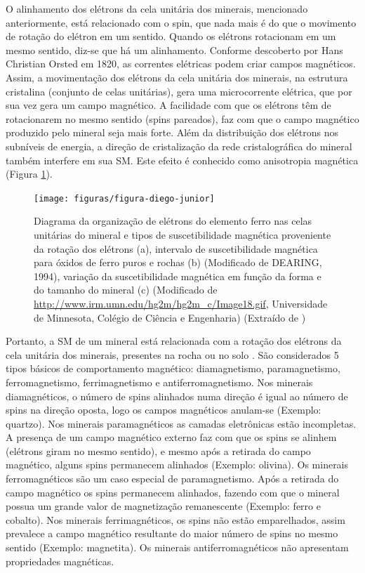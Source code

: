 O alinhamento dos elétrons da cela unitária dos minerais, mencionado anteriormente, está relacionado com o spin, que nada mais é do que o movimento de rotação do elétron em um sentido. Quando os elétrons rotacionam em um mesmo sentido, diz-se que há um alinhamento. Conforme descoberto por Hans Christian Orsted em 1820, as correntes elétricas podem criar campos magnéticos. Assim, a movimentação dos elétrons da cela unitária dos minerais, na estrutura cristalina (conjunto de celas unitárias), gera uma microcorrente elétrica, que por sua vez gera um campo magnético. A facilidade com que os elétrons têm de rotacionarem no mesmo sentido (spins pareados), faz com que o campo magnético produzido pelo mineral seja mais forte. Além da distribuição dos elétrons nos subníveis de energia, a direção de cristalização da rede cristalográfica do mineral também interfere em sua SM. Este efeito é conhecido como anisotropia magnética (Figura \ref{fig:figura1}).




\begin{figure}[tb!]
\begin{minipage}[t]{1\linewidth}
\begin{center}
   \texttt{[image: figuras/figura-diego-junior]}
   \caption{Diagrama da organização de elétrons do elemento ferro nas celas unitárias do mineral e tipos de suscetibilidade magnética proveniente da rotação dos elétrons (a), intervalo de suscetibilidade magnética para óxidos de ferro puros e rochas (b) (Modificado de DEARING, 1994), variação da suscetibilidade magnética em função da forma e do tamanho do mineral (c) (Modificado de \url{http://www.irm.umn.edu/hg2m/hg2m_c/Image18.gif}, Universidade de Minnesota, Colégio de Ciência e Engenharia) (Extraído de \cite{siqueira:2013})
   \label{fig:figura1}}
\end{center}
\end{minipage}
\end{figure}




Portanto, a SM de um mineral está relacionada com a rotação dos elétrons da cela unitária dos minerais, presentes na rocha ou no solo \citep{craik:1995}. São considerados 5 tipos básicos de comportamento magnético: diamagnetismo, paramagnetismo, ferromagnetismo, ferrimagnetismo e antiferromagnetismo. Nos minerais diamagnéticos, o número de spins alinhados numa direção é igual ao número de spins na direção oposta, logo os campos magnéticos anulam-se (Exemplo: quartzo). Nos minerais paramagnéticos as camadas eletrônicas estão incompletas. A presença de um campo magnético externo faz com que os spins se alinhem (elétrons giram no mesmo sentido), e mesmo após a retirada do campo magnético, alguns spins permanecem alinhados (Exemplo: olivina). Os minerais ferromagnéticos são um caso especial de paramagnetismo. Após a retirada do campo magnético os spins permanecem alinhados, fazendo com que o mineral possua um grande valor de magnetização remanescente (Exemplo: ferro e cobalto). Nos minerais ferrimagnéticos, os spins não estão emparelhados, assim prevalece a campo magnético resultante do maior número de spins no mesmo sentido (Exemplo: magnetita). Os minerais antiferromagnéticos não apresentam propriedades magnéticas.




